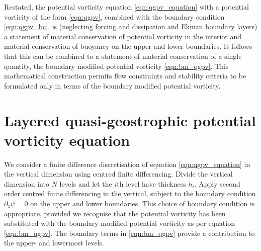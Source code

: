 \documentclass[a4paper]{book}
\begin{document}
Restated, the potential vorticity equation \eqref{eqn:qgpv_equation} with
a potential vorticity of the form \eqref{eqn:qgpv}, combined
with the boundary condition \eqref{eqn:qgpv_bc}, is (neglecting forcing and
dissipation and Ekman boundary layers) a statement of material conservation
of potential vorticity in the interior and material conservation of buoyancy on the
upper and lower boundaries. It follows that this can be combined to a statement
of material conservation of a single quantity, the boundary modified potential
vorticity \eqref{eqn:bm_qgpv}. This mathematical construction permits
flow constraints and stability criteria to be formulated only in terms of the
boundary modified potential vorticity.

\section{Layered quasi-geostrophic potential vorticity equation}\label{sect:qgpv_layered}

We consider a finite difference discretisation of equation
\eqref{eqn:qgpv_equation} in the vertical dimension using centred finite
differencing. Divide the vertical dimension into $N$ levels and let the
$i$th level have thickness $h_i$. Apply second order centred finite differencing
in the vertical, subject to the boundary condition $\partial_z \psi = 0$ on the
upper and lower boundaries. This choice of boundary condition is appropriate,
provided we recognise that the potential vorticity has been substituted
with the boundary modified potential vorticity as per equation
\eqref{eqn:bm_qgpv}. The boundary terms in \eqref{eqn:bm_qgpv} provide a
contribution to the upper- and lowermost levels.
\end{document}
